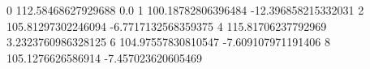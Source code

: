 0 112.58468627929688 0.0
1 100.18782806396484 -12.396858215332031
2 105.81297302246094 -6.7717132568359375
4 115.81706237792969 3.2323760986328125
6 104.97557830810547 -7.609107971191406
8 105.1276626586914 -7.457023620605469
